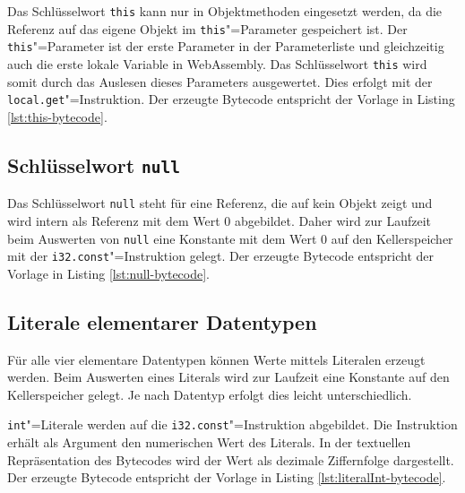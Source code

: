 Das Schlüsselwort \lstinline{this} kann nur in Objektmethoden eingesetzt werden, da die Referenz auf das eigene Objekt im \lstinline{this}"=Parameter gespeichert ist. Der \lstinline{this}"=Parameter ist der erste Parameter in der Parameterliste und gleichzeitig auch die erste lokale Variable in WebAssembly. Das Schlüsselwort \lstinline{this} wird somit durch das Auslesen dieses Parameters ausgewertet. Dies erfolgt mit der \lstinline{local.get}"=Instruktion. Der erzeugte Bytecode entspricht der Vorlage in Listing \ref{lst:this-bytecode}.

\pagebreak


\subsection{Schlüsselwort \lstinline{null}}

Das Schlüsselwort \lstinline{null} steht für eine Referenz, die auf kein Objekt zeigt und wird intern als Referenz mit dem Wert $0$ abgebildet. Daher wird zur Laufzeit beim Auswerten von \lstinline{null} eine Konstante mit dem Wert $0$ auf den Kellerspeicher mit der \lstinline{i32.const}"=Instruktion gelegt. Der erzeugte Bytecode entspricht der Vorlage in Listing \ref{lst:null-bytecode}.



\subsection{Literale elementarer Datentypen}

Für alle vier elementare Datentypen können Werte mittels Literalen erzeugt werden. Beim Auswerten eines Literals wird zur Laufzeit eine Konstante auf den Kellerspeicher gelegt. Je nach Datentyp erfolgt dies leicht unterschiedlich.

\lstinline{int}"=Literale werden auf die \lstinline{i32.const}"=Instruktion abgebildet. Die Instruktion erhält als Argument den numerischen Wert des Literals. In der textuellen Repräsentation des Bytecodes wird der Wert als dezimale Ziffernfolge dargestellt. Der erzeugte Bytecode entspricht der Vorlage in Listing \ref{lst:literalInt-bytecode}.



